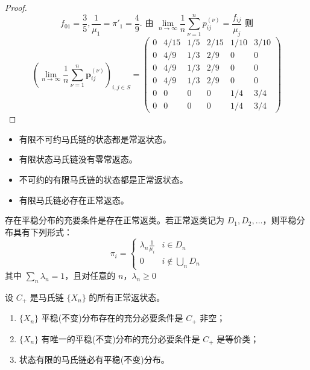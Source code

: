 \documentclass[lang=cn,10pt,thmcnt=section]{elegantbook}
\begin{document}
\begin{proof}
\[
f_{01} = \frac{3}{5}, \frac{1}{\mu_1} = \pi'_1 = \frac{4}{9}. \text{ 由 } \lim_{n \to \infty} \frac{1}{n} \sum_{\nu=1}^{n} p_{ij}^{(\nu)} = \frac{f_{ij}}{\mu_j} \text{ 则}
\]
\[
\left( \lim_{n \to \infty} \frac{1}{n} \sum_{\nu=1}^{n} \mathbf{p}_{ij}^{(\nu)} \right)_{i,j \in S} = \begin{pmatrix}
0 & 4/15 & 1/5 & 2/15 & 1/10 & 3/10 \\
0 & 4/9 & 1/3 & 2/9 & 0 & 0 \\
0 & 4/9 & 1/3 & 2/9 & 0 & 0 \\
0 & 4/9 & 1/3 & 2/9 & 0 & 0 \\
0 & 0 & 0 & 0 & 1/4 & 3/4 \\
0 & 0 & 0 & 0 & 1/4 & 3/4
\end{pmatrix}
\]

\end{proof}

\begin{remark}
	\begin{itemize}
		\item 有限不可约马氏链的状态都是常返状态。
		\item 有限状态马氏链没有零常返态。
		\item 不可约的有限马氏链的状态都是正常返状态。
		\item 有限马氏链必存在正常返态。
	\end{itemize}
\end{remark}
\begin{theorem}
	存在平稳分布的充要条件是存在正常返类。若正常返类记为 $D_1, D_2, \ldots$，则平稳分布具有下列形式：
\[
\pi_i = 
\begin{cases} 
\lambda_n \frac{1}{\mu_i} & i \in D_n \\
0 & i \notin \bigcup_n D_n 
\end{cases}
\]
其中 $\sum_n \lambda_n = 1$，且对任意的 $n$，$\lambda_n \geq 0$

\end{theorem}
\begin{theorem}
	设 $C_+$ 是马氏链 $\{X_n\}$ 的所有正常返状态。

\begin{enumerate}
    \item $\{X_n\}$ 平稳(不变)分布存在的充分必要条件是 $C_+$ 非空；
    \item $\{X_n\}$ 有唯一的平稳(不变)分布的充分必要条件是 $C_+$ 是等价类；
    \item 状态有限的马氏链必有平稳(不变)分布。
\end{enumerate}
\end{theorem}
\end{document}
